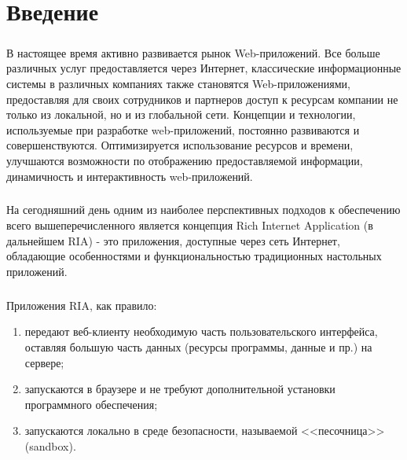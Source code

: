 \chapter*{Введение} %

\paragraph{ }

В настоящее время активно развивается рынок Web-приложений. Все больше различных услуг предоставляется через Интернет, классические информационные системы в различных компаниях также становятся Web-приложениями, предоставляя для своих сотрудников и партнеров доступ к ресурсам компании не только из локальной, но и из глобальной сети. Концепции и технологии,  используемые при разработке web-приложений, постоянно развиваются и совершенствуются.  Оптимизируется использование ресурсов и времени, улучшаются возможности по отображению предоставляемой информации,  динамичность и интерактивность web-приложений.

\paragraph{ }  

На сегодняшний день одним из наиболее перспективных подходов к обеспечению всего вышеперечисленного является концепция Rich Internet Application (в дальнейшем RIA) - это приложения, доступные через сеть Интернет, обладающие  особенностями и функциональностью традиционных настольных приложений.

\paragraph{ }
 
Приложения RIA, как правило:

\begin{enumerate}

\item передают веб-клиенту необходимую часть пользовательского   интерфейса, оставляя большую часть данных (ресурсы программы, данные и пр.) на сервере;
\item запускаются в браузере  и не требуют дополнительной установки программного обеспечения;
\item запускаются локально в среде безопасности, называемой <<песочница>>(sandbox).
\end{enumerate}

